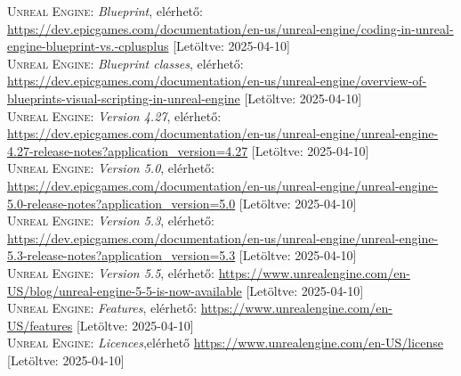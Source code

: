 \documentclass[
]{thesis-ekf}
\theoremstyle{definition}
\theoremstyle{remark}
\begin{document}
\begin{thebibliography}{2}
\textsc{Unreal Engine}: \emph{Blueprint}, elérhető:
\url{https://dev.epicgames.com/documentation/en-us/unreal-engine/coding-in-unreal-engine-blueprint-vs.-cplusplus} [Letöltve: 2025-04-10]\\
\textsc{Unreal Engine}: \emph{Blueprint classes}, elérhető:
\url{https://dev.epicgames.com/documentation/en-us/unreal-engine/overview-of-blueprints-visual-scripting-in-unreal-engine} [Letöltve: 2025-04-10]\\
\textsc{Unreal Engine}: \emph{Version 4.27}, elérhető:
\url{https://dev.epicgames.com/documentation/en-us/unreal-engine/unreal-engine-4.27-release-notes?application_version=4.27} [Letöltve: 2025-04-10]\\
\textsc{Unreal Engine}: \emph{Version 5.0}, elérhető:
\url{https://dev.epicgames.com/documentation/en-us/unreal-engine/unreal-engine-5.0-release-notes?application_version=5.0} [Letöltve: 2025-04-10]\\
\textsc{Unreal Engine}: \emph{Version 5.3}, elérhető:
\url{https://dev.epicgames.com/documentation/en-us/unreal-engine/unreal-engine-5.3-release-notes?application_version=5.3} [Letöltve: 2025-04-10]\\
\textsc{Unreal Engine}: \emph{Version 5.5}, elérhető:
\url{https://www.unrealengine.com/en-US/blog/unreal-engine-5-5-is-now-available} [Letöltve: 2025-04-10]\\
\textsc{Unreal Engine}: \emph{Features}, elérhető:
\url{https://www.unrealengine.com/en-US/features} [Letöltve: 2025-04-10]\\
\textsc{Unreal Engine}: \emph{Licences},elérhető
\url{https://www.unrealengine.com/en-US/license} [Letöltve: 2025-04-10]\\


\end{thebibliography}
\end{document}
